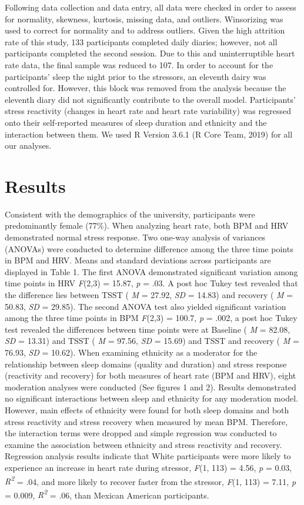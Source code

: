 \documentclass[
  man, fleqn, noextraspace]{apa6}
\begin{document}
Following data collection and data entry, all data were checked in order to assess for normality, skewness, kurtosis, missing data, and outliers. Winsorizing was used to correct for normality and to address outliers. Given the high attrition rate of this study, 133 participants completed daily diaries; however, not all participants completed the second session. Due to this and uninterruptible heart rate data, the final sample was reduced to 107. In order to account for the participants' sleep the night prior to the stressors, an eleventh dairy was controlled for. However, this block was removed from the analysis because the eleventh diary did not significantly contribute to the overall model. Participants' stress reactivity (changes in heart rate and heart rate variability) was regressed onto their self-reported measures of sleep duration and ethnicity and the interaction between them. We used R Version 3.6.1 (R Core Team, 2019) for all our analyses.

\hypertarget{results}{%
\section{Results}\label{results}}

Consistent with the demographics of the university, participants were predominantly female (77\%). When analyzing heart rate, both BPM and HRV demonstrated normal stress response. Two one-way analysis of variances (ANOVAs) were conducted to determine difference among the three time points in BPM and HRV. Means and standard deviations across participants are displayed in Table 1. The first ANOVA demonstrated significant variation among time points in HRV \emph{F}(2,3) = 15.87, \emph{p} = .03. A post hoc Tukey test revealed that the difference lies between TSST ( \emph{M} = 27.92, \emph{SD} = 14.83) and recovery ( \emph{M} = 50.83, \emph{SD} = 29.85). The second ANOVA test also yielded significant variation among the three time points in BPM \emph{F}(2,3) = 100.7, \emph{p} = .002, a post hoc Tukey test revealed the differences between time points were at Baseline ( \emph{M} = 82.08, \emph{SD} = 13.31) and TSST ( \emph{M} = 97.56, \emph{SD} = 15.69) and TSST and recovery ( \emph{M} = 76.93, \emph{SD} = 10.62).
When examining ethnicity as a moderator for the relationship between sleep domains (quality and duration) and stress response (reactivity and recovery) for both measures of heart rate (BPM and HRV), eight moderation analyses were conducted (See figures 1 and 2). Results demonstrated no significant interactions between sleep and ethnicity for any moderation model. However, main effects of ethnicity were found for both sleep domains and both stress reactivity and stress recovery when measured by mean BPM. Therefore, the interaction terms were dropped and simple regression was conducted to examine the association between ethnicity and stress reactivity and recovery. Regression analysis results indicate that White participants were more likely to experience an increase in heart rate during stressor, \emph{F}(1, 113) = 4.56, \emph{p} = 0.03, \emph{R\textsuperscript{2}} = .04, and more likely to recover faster from the stressor, \emph{F}(1, 113) = 7.11, \emph{p} = 0.009, \emph{R\textsuperscript{2}} = .06, than Mexican American participants.
\end{document}
